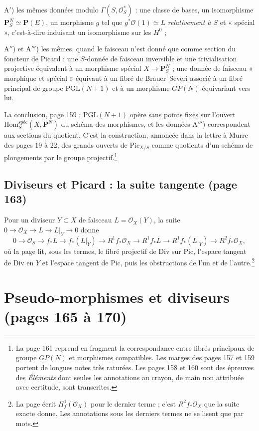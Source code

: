 \documentclass[11pt,a4paper]{article}
\begin{document}
A$'$) les mêmes données modulo $\Gamma(S, \mathcal{O}_S^*)$ : une classe de
bases, un isomorphisme $\mathbf{P}^N_S \simeq \mathbf{P}(E)$, un morphisme
$g$ tel que $g^*\mathcal{O}(1) \simeq L$ \emph{relativement à $S$} et
« spécial », c'est-à-dire induisant un isomorphisme sur les $H^0$ ;

A$''$) et A$'''$) les mêmes, quand le faisceau n'est donné que comme section
du foncteur de Picard : une $S$-donnée de faisceau inversible et une
trivialisation projective équivalent à un morphisme spécial
$X \to \mathbf{P}^N_S$ ; une donnée de faisceau « morphique et spécial »
équivaut à un fibré de Brauer--Severi associé à un fibré principal de groupe
$\mathrm{PGL}(N+1)$ et à un morphisme $GP(N)$-équivariant vers lui.

La conclusion, page 159 : $\mathrm{PGL}(N+1)$ opère sans points fixes sur
l'ouvert $\mathrm{Hom}^{\mathrm{spéc}}_S(X, \mathbf{P}^N)$ du schéma des
morphismes, et les données A$'''$) correspondent aux sections du quotient.
C'est la construction, annoncée dans la lettre à Murre des pages 19 à 22, des
grands ouverts de $\mathrm{Pic}_{X/S}$ comme quotients d'un schéma de
plongements par le groupe projectif.\footnote{La page 161 reprend en fragment
la correspondance entre fibrés principaux de groupe $GP(N)$ et morphismes
compatibles. Les marges des pages 157 et 159 portent de longues notes très
raturées. Les pages 158 et 160 sont des épreuves des \emph{Éléments} dont
seules les annotations au crayon, de main non attribuée avec certitude, sont
transcrites.}

\subsection*{Diviseurs et Picard : la suite tangente (page 163)}

Pour un diviseur $Y \subset X$ de faisceau $L = \mathcal{O}_X(Y)$, la suite
$0 \to \mathcal{O}_X \to L \to L|_Y \to 0$ donne
\[
0 \to \mathcal{O}_S \to f_*L \to f_*(L|_Y) \to R^1 f_*\mathcal{O}_X \to R^1 f_*L \to R^1 f_*(L|_Y) \to R^2 f_*\mathcal{O}_X ,
\]
où la page lit, sous les termes, le fibré projectif de $\mathrm{Div}$ sur
$\mathrm{Pic}$, l'espace tangent de $\mathrm{Div}$ en $Y$ et l'espace tangent
de $\mathrm{Pic}$, puis les obstructions de l'un et de l'autre.\footnote{La page
écrit $H^1_f(\mathcal{O}_X)$ pour le dernier terme ; c'est $R^2 f_*\mathcal{O}_X$
que la suite exacte donne. Les annotations sous les derniers termes ne se lisent
que par mots.}

\section*{Pseudo-morphismes et diviseurs (pages 165 à 170)}
\end{document}
